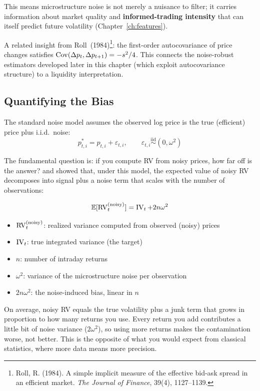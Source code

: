 This means microstructure noise is not merely a nuisance to filter; it carries information about market quality and \textbf{informed-trading intensity} that can itself predict future volatility (Chapter~\ref{ch:features}).

A related insight from Roll~(1984)\footnote{Roll, R. (1984). A simple implicit measure of the effective bid-ask spread in an efficient market. \textit{The Journal of Finance}, 39(4), 1127--1139.}: the first-order autocovariance of price changes satisfies $\operatorname{Cov}(\Delta p_t, \Delta p_{t+1}) = -s^2/4$.
This connects the noise-robust estimators developed later in this chapter (which exploit autocovariance structure) to a liquidity interpretation.

\subsection{Quantifying the Bias}

The standard noise model assumes the observed log price is the true (efficient) price plus i.i.d.\ noise:
\[
  p^*_{t,i} = p_{t,i} + \varepsilon_{t,i}, \qquad \varepsilon_{t,i} \overset{\text{iid}}{\sim} (0, \omega^2)
\]

The fundamental question is: if you compute RV from noisy prices, how far off is the answer?
\citet{HansenLunde2006} and \citet{AitSahaliaMyklandZhang2005} showed that, under this model, the expected value of noisy RV decomposes into signal plus a noise term that scales with the number of observations:

\begin{equation}
  \mathbb{E}[\operatorname{RV}_t^{(\text{noisy})}] = \operatorname{IV}_t + 2n\omega^2
  \label{eq:rv-noise-bias}
\end{equation}
\begin{itemize}[nosep]
  \item $\operatorname{RV}_t^{(\text{noisy})}$: realized variance computed from observed (noisy) prices
  \item $\operatorname{IV}_t$: true integrated variance (the target)
  \item $n$: number of intraday returns
  \item $\omega^2$: variance of the microstructure noise per observation
  \item $2n\omega^2$: the noise-induced bias, linear in $n$
\end{itemize}

\begin{intuition}
On average, noisy RV equals the true volatility plus a junk term that grows in proportion to how many returns you use.
Every return you add contributes a little bit of noise variance ($2\omega^2$), so using more returns makes the contamination worse, not better.
This is the opposite of what you would expect from classical statistics, where more data means more precision.
\end{intuition}

